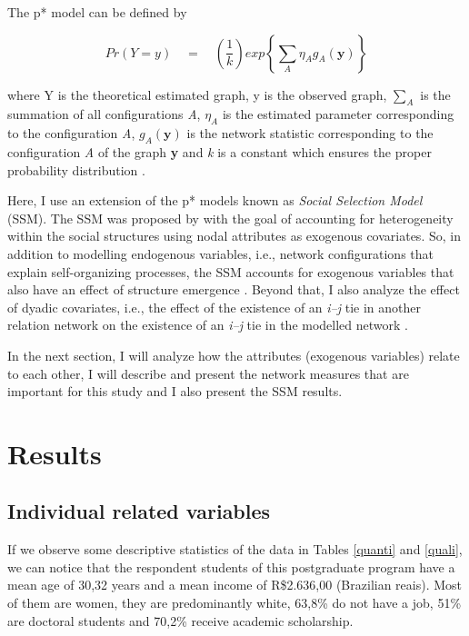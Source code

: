 \documentclass[12pt, english]{article}
\begin{document}
The p* model can be defined by

\begin{equation}
Pr(Y=y) \quad = \quad \left(\frac{1}{k}\right) exp \left\{ \sum_{A} \eta_A g_A (\textbf{y}) \right\}
\end{equation}

where Y is the theoretical estimated graph, y is the observed graph, $\sum_{A}$ is the summation of all configurations \textit{A},  $\eta_A$ is the estimated parameter corresponding to the configuration \textit{A}, $g_A(\textbf{y})$ is the network statistic corresponding to the configuration \textit{A} of the graph \textbf{y} and \textit{k} is a constant which ensures the proper probability distribution \cite{robins2007introduction}.

Here, I use an extension of the p* models known as \textit{Social Selection Model} (SSM). The SSM was proposed by \cite{robins2001network} with the goal of accounting for heterogeneity within the social structures using nodal attributes as exogenous covariates. So, in addition to modelling endogenous variables, i.e., network configurations that explain self-organizing processes, the SSM accounts for exogenous variables that also have an effect of structure emergence \cite{wang2016social}. Beyond that, I also analyze the effect of dyadic covariates, i.e., the effect of the existence of an \textit{i--j} tie in another relation network on the existence of an \textit{i--j} tie in the modelled network \cite{robins2013social}.

In the next section, I will analyze how the attributes (exogenous variables) relate to each other, I will describe and present the network measures that are important for this study and I also present the SSM results.

\section{Results}
\subsection{Individual related variables}

If we observe some descriptive statistics of the data in Tables \ref{quanti} and \ref{quali}, we can notice that the respondent students of this postgraduate program have a mean age of 30,32 years and a mean income of R\$2.636,00 (Brazilian reais). Most of them are women, they are predominantly white, 63,8\% do not have a job, 51\% are doctoral students and 70,2\% receive academic scholarship.
\end{document}
